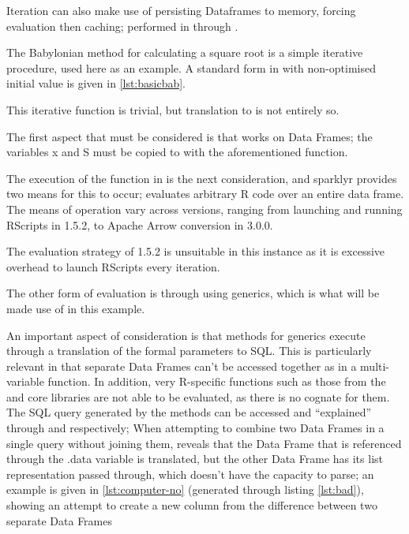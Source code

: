 Iteration can also make use of persisting  Dataframes to memory,
forcing evaluation then caching; performed in  through
.

The Babylonian method for calculating a square root is a simple
iterative procedure, used here as an example. A standard form in \R{} with
non-optimised initial value is given in \cref{lst:basicbab}.



This iterative function is trivial, but translation to  is not
entirely so.

The first aspect that must be considered is that  works on 
Data Frames; the variables x and S must be copied to  with the
aforementioned 
function.

The execution of the function in  is the next consideration, and
sparklyr provides two means for this to occur;
 evaluates arbitrary R
code over an entire data frame. The means of operation vary across 
versions, ranging from launching and running RScripts in  1.5.2, to
Apache Arrow conversion in  3.0.0.

The evaluation strategy of 1.5.2 is unsuitable in this instance as it is
excessive overhead to launch RScripts every iteration.

The other form of evaluation is through using  generics, which is
what will be made use of in this example.

An important aspect of consideration is that  methods for 
generics execute through a translation of the formal parameters to 
SQL. This is particularly relevant in that separate  Data Frames
can't be accessed together as in a multi-variable function. In addition,
very R-specific functions such as those from the  and
 core libraries are not able to be evaluated, as there is
no  cognate for them. The SQL query generated by the methods
can be accessed and ``explained'' through
 and
 respectively; When attempting
to combine two  Data Frames in a single query without joining them,
 reveals that the Data
Frame that is referenced through the .data variable is
translated, but the other Data Frame has its list representation passed
through, which  doesn't have the capacity to parse; an example
is given in \cref{lst:computer-no} (generated through listing
\cref{lst:bad}), showing an attempt to create a new column from the
difference between two separate Data Frames

